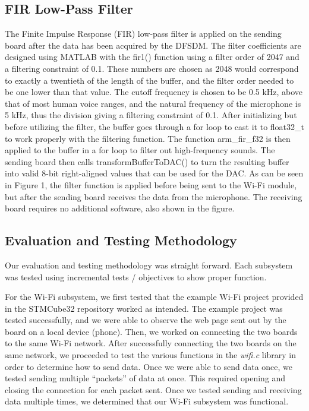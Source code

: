 \documentclass[journal]{IEEEtran}
\begin{document}
\subsection{FIR Low-Pass Filter}
The Finite Impulse Response (FIR) low-pass filter is applied on the sending board after the data has been acquired by the DFSDM. The filter coefficients are designed using MATLAB with the fir1() function using a filter order of 2047 and a filtering constraint of 0.1. These numbers are chosen as 2048 would correspond to exactly a twentieth of the length of the buffer, and the filter order needed to be one lower than that value. The cutoff frequency is chosen to be 0.5 kHz, above that of most human voice ranges, and the natural frequency of the microphone is 5 kHz, thus the division giving a filtering constraint of 0.1. After initializing but before utilizing the filter, the buffer goes through a for loop to cast it to float32\_t to work properly with the filtering function. The function arm\_fir\_f32 is then applied to the buffer in a for loop to filter out high-frequency sounds. The sending board then calls transformBufferToDAC() to turn the resulting buffer into valid 8-bit right-aligned values that can be used for the DAC. As can be seen in Figure 1, the filter function is applied before being sent to the Wi-Fi module, but after the sending board receives the data from the microphone. The receiving board requires no additional software, also shown in the figure.

\subsection{Evaluation and Testing Methodology}
Our evaluation and testing methodology was straight forward. Each subsystem was tested using incremental tests / objectives to show proper function. 
\vspace{10pt}

For the Wi-Fi subsystem, we first tested that the example Wi-Fi project provided in the STMCube32 repository worked as intended. The example project was tested successfully, and we were able to observe the web page sent out by the board on a local device (phone). Then, we worked on connecting the two boards to the same Wi-Fi network. After successfully connecting the two boards on the same network, we proceeded to test the various functions in the \textit{wifi.c} library in order to determine how to send data. Once we were able to send data once, we tested sending multiple ``packets'' of data at once. This required opening and closing the connection for each packet sent. Once we tested sending and receiving data multiple times, we determined that our Wi-Fi subsystem was functional.
\vspace{10pt}
\end{document}
